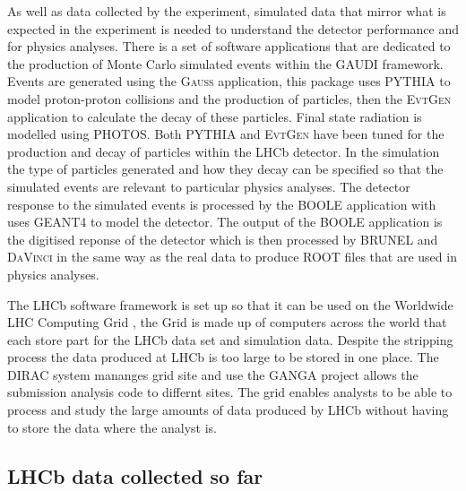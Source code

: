 As well as data collected by the experiment, simulated data that mirror what is expected in the experiment is needed to understand the detector performance and for physics analyses. There is a set of software applications that are dedicated to the production of Monte Carlo simulated events within the \textsc{GAUDI} framework. Events are generated using the \textsc{Gauss}\cite{1742-6596-331-3-032047, Clemencic:2011zza} application, this package uses \textsc{PYTHIA}\cite{Sjostrand:2006za,Sjostrand:2007gs} to model proton-proton collisions and the production of particles, then the \textsc{Evt}\textsc{Gen}\cite{Lange:2001uf} application to calculate the decay of these particles. Final state radiation is modelled using \textsc{PHOTOS}\cite{Golonka:2005pn}. Both \textsc{PYTHIA} and \textsc{Evt}\textsc{Gen} have been tuned for the production and decay of particles within the LHCb detector. In the simulation the type of particles generated and how they decay can be specified so that the simulated events are relevant to particular physics analyses. The detector response to the simulated events is processed by the \textsc{BOOLE} application with uses \textsc{GEANT4}\cite{Agostinelli:2002hh,Allison:2006ve} to model the detector. The output of the BOOLE application is the digitised reponse of the detector which is then processed by \textsc{BRUNEL} and \textsc{DaVinci} in the same way as the real data to produce \textsc{ROOT} files that are used in physics analyses. %

The LHCb software framework is set up so that it can be used on the Worldwide LHC Computing Grid \cite{Bird:2011zz, WWCG}, the Grid is made up of computers across the world that each store part for the LHCb data set and simulation data. Despite the stripping process the data produced at LHCb is too large to be stored in one place. The \textsc{DIRAC}\cite{Paterson:1397926} system mananges grid site and use the \textsc{GANGA} project allows the submission analysis code to differnt sites. The grid enables analysts to be able to process and study the large amounts of data produced by LHCb without having to store the data where the analyst is. 





\subsection{LHCb data collected so far}
\label{LHCb_data}

